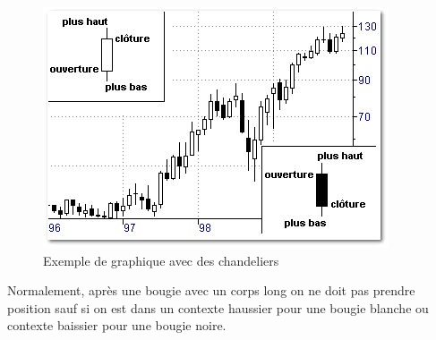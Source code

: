 \begin{figure}[H]
  \center
  \includegraphics[scale=0.5]{../graph/chandelier.png}
  \caption{Exemple de graphique avec des chandeliers}
\end{figure}

Normalement, après une bougie avec un corps long on ne doit pas prendre position sauf si on est dans un contexte haussier pour une bougie blanche ou contexte baissier pour une bougie noire. 

